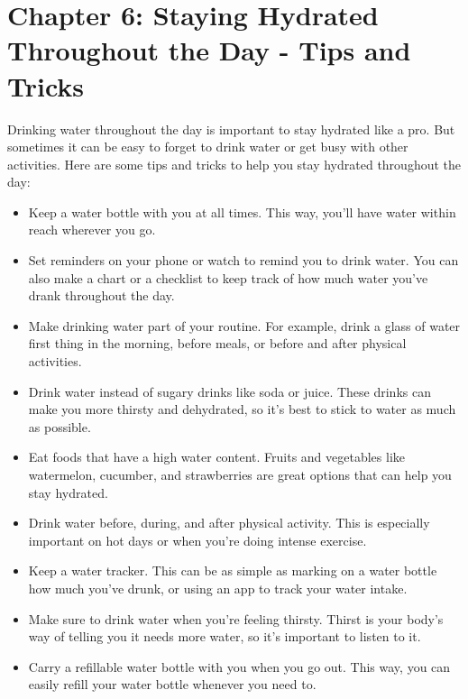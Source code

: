 \chapter{ Chapter 6: Staying Hydrated Throughout the Day - Tips and Tricks
}

Drinking water throughout the day is important to stay hydrated like a pro. But sometimes it can be easy to forget to drink water or get busy with other activities.
Here are some tips and tricks to help you stay hydrated throughout the day:

\begin{itemize}
    \item Keep a water bottle with you at all times. This way, you'll have water within reach wherever you go.
\item Set reminders on your phone or watch to remind you to drink water. You can also make a chart or a checklist to keep track of how much water you've drank throughout the day.

\item Make drinking water part of your routine. For example, drink a glass of water first thing in the morning, before meals, or before and after physical activities.

\item Drink water instead of sugary drinks like soda or juice. These drinks can make you more thirsty and dehydrated, so it's best to stick to water as much as possible.

\item Eat foods that have a high water content. Fruits and vegetables like watermelon, cucumber, and strawberries are great options that can help you stay hydrated.

\item Drink water before, during, and after physical activity. This is especially important on hot days or when you're doing intense exercise.

\item Keep a water tracker. This can be as simple as marking on a water bottle how much you've drunk, or using an app to track your water intake.

\item Make sure to drink water when you're feeling thirsty. Thirst is your body's way of telling you it needs more water, so it's important to listen to it.

\item Carry a refillable water bottle with you when you go out. This way, you can easily refill your water bottle whenever you need to.

\end{itemize}

